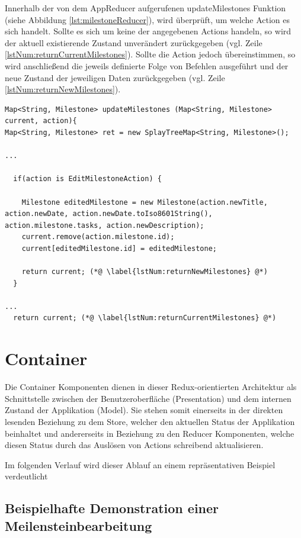 \documentclass[bibliography=totoc,listof=totoc,BCOR=5mm,DIV=12,oneside]{scrbook}
\begin{document}
\par Innerhalb der von dem AppReducer aufgerufenen updateMilestones Funktion (siehe Abbildung \ref{lst:milestoneReducer}), wird überprüft, um welche Action es sich handelt. Sollte es sich um keine der angegebenen Actions handeln, so wird der aktuell existierende Zustand unverändert zurückgegeben (vgl. Zeile \ref{lstNum:returnCurrentMilestones}). Sollte die Action jedoch übereinstimmen, so wird anschließend die jeweils definierte Folge von Befehlen ausgeführt und der neue Zustand der jeweiligen Daten zurückgegeben (vgl. Zeile \ref{lstNum:returnNewMilestones}).

\bigskip
\begin{lstlisting}[caption={Meilenstein Reducer Beispiel},captionpos=b, label=lst:milestoneReducer]
Map<String, Milestone> updateMilestones (Map<String, Milestone> current, action){
Map<String, Milestone> ret = new SplayTreeMap<String, Milestone>();

...

  if(action is EditMilestoneAction) {

    Milestone editedMilestone = new Milestone(action.newTitle, action.newDate, action.newDate.toIso8601String(), action.milestone.tasks, action.newDescription);
    current.remove(action.milestone.id);
    current[editedMilestone.id] = editedMilestone;

    return current; (*@ \label{lstNum:returnNewMilestones} @*)
  }
  
...
  return current; (*@ \label{lstNum:returnCurrentMilestones} @*)
\end{lstlisting}
\bigskip

\newpage
\section{Container}
\par Die Container Komponenten dienen in dieser Redux-orientierten Architektur als Schnittstelle zwischen der Benutzeroberfläche (Presentation) und dem internen Zustand der Applikation (Model). Sie stehen somit einerseits in der direkten lesenden Beziehung zu dem Store, welcher den aktuellen Status der Applikation beinhaltet und andererseits in Beziehung zu den Reducer Komponenten, welche diesen Status durch das Auslösen von Actions schreibend aktualisieren. 
\par Im folgenden Verlauf wird dieser Ablauf an einem repräsentativen Beispiel verdeutlicht

\subsection{Beispielhafte Demonstration einer Meilensteinbearbeitung}
\end{document}
